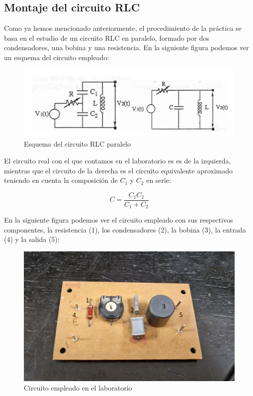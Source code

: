 \documentclass[a4paper,12pt,titlepage]{article}
\begin{document}
\subsection{Montaje del circuito RLC}

Como ya hemos mencionado anteriormente, el procedimiento de la práctica se basa en el estudio de un circuito RLC en paralelo, formado por dos condensadores, una bobina y una resistencia. En la siguiente figura podemos ver un esquema del circuito empleado:

\begin{figure}[h!]
    \centering
    \includegraphics[width=0.65\linewidth]{fourier/rlc_circuito.png}
    \caption{Esquema del circuito RLC paralelo}
    \label{fig:enter-label}
\end{figure}

El circuito real con el que contamos en el laboratorio es es de la izquierda, mientras que el circuito de la derecha es el circuito equivalente aproximado teniendo en cuenta la composición de $C_1$ y $C_2$ en serie:

\begin{equation}
    C = \frac{C_1C_2}{C_1+C_2}
    \label{capacitancia}
\end{equation}

En la siguiente figura podemos ver el circuito empleado con sus respectivos componentes, la resistencia (1), los condensadores (2), la bobina (3), la entrada (4) y la salida (5):

\begin{figure}[h!]
    \centering
    \includegraphics[width=0.65\linewidth]{fourier/rlc_paralelo_foto.jpg}
    \caption{Circuito empleado en el laboratorio}
    \label{fig:enter-label}
\end{figure}
\end{document}
